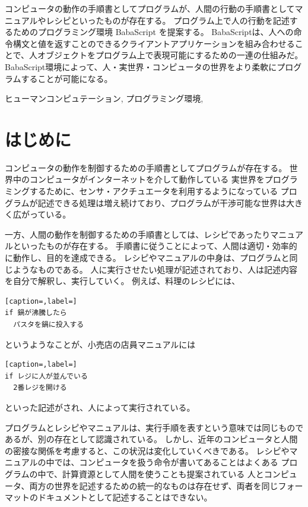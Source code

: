 \documentclass{deimj}
\begin{document}
\pagestyle{empty}
\begin{jabstract}
コンピュータの動作の手順書としてプログラムが、人間の行動の手順書としてマニュアルやレシピといったものが存在する。
プログラム上で人の行動を記述するためのプログラミング環境 BabaScript を提案する。
BabaScriptは、人への命令構文と値を返すことのできるクライアントアプリケーションを組み合わせることで、人オブジェクトをプログラム上で表現可能にするための一連の仕組みだ。
BabaScript環境によって、人・実世界・コンピュータの世界をより柔軟にプログラムすることが可能になる。
\end{jabstract}
\begin{jkeyword}
ヒューマンコンピュテーション, プログラミング環境, 
\end{jkeyword}
\maketitle

\section{はじめに}

コンピュータの動作を制御するための手順書としてプログラムが存在する。
世界中のコンピュータがインターネットを介して動作している
実世界をプログラミングするために、センサ・アクチュエータを利用するようになっている
プログラムが記述できる処理は増え続けており、プログラムが干渉可能な世界は大きく広がっている。

一方、人間の動作を制御するための手順書としては、レシピであったりマニュアルといったものが存在する。
手順書に従うことによって、人間は適切・効率的に動作し、目的を達成できる。
レシピやマニュアルの中身は、プログラムと同じようなものである。
人に実行させたい処理が記述されており、人は記述内容を自分で解釈し、実行していく。
例えば、料理のレシピには、

\begin{lstlisting}[caption=,label=]
if 鍋が沸騰したら
  パスタを鍋に投入する
\end{lstlisting}
    
というようなことが、小売店の店員マニュアルには

\begin{lstlisting}[caption=,label=]
if レジに人が並んでいる
  2番レジを開ける
\end{lstlisting}
    
といった記述がされ、人によって実行されている。

プログラムとレシピやマニュアルは、実行手順を表すという意味では同じものであるが、別の存在として認識されている。
しかし、近年のコンピュータと人間の密接な関係を考慮すると、この状況は変化していくべきである。
レシピやマニュアルの中では、コンピュータを扱う命令が書いてあることはよくある
プログラムの中で、計算資源として人間を使うことも提案されている
人とコンピュータ、両方の世界を記述するための統一的なものは存在せず、両者を同じフォーマットのドキュメントとして記述することはできない。
\end{document}
